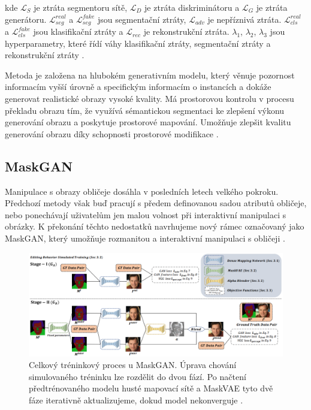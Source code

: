kde $\mathcal{L}_{S}$ je ztráta segmentoru sítě, $\mathcal{L}_D$ je ztráta diskriminátoru a  $\mathcal{L}_{G}$ je ztráta generátoru. $\mathcal{L}_{seg}^{real}$ a $\mathcal{L}_{seg}^{fake}$ jsou segmentační ztráty, $\mathcal{L}_{adv}$ je nepříznivá ztráta.  $\mathcal{L}_{cls}^{real}$ a $\mathcal{L}_{cls}^{fake}$ jsou klasifikační ztráty a $\mathcal{L}_{rec}$ je rekonstrukční ztráta. $\lambda _{1}$, $\lambda _{2}$, $\lambda _{3}$ jsou hyperparametry, které řídí váhy klasifikační ztráty, segmentační ztráty a rekonstrukční ztráty \cite{sggan}.

\bigskip

\noindent Metoda je založena na hlubokém generativním modelu, který věnuje pozornost informacím vyšší úrovně a specifickým informacím o instancích a dokáže generovat realistické obrazy vysoké kvality. Má prostorovou kontrolu v procesu překladu obrazu tím, že využívá sémantickou segmentaci ke zlepšení výkonu generování obrazu a poskytuje prostorové mapování. Umožňuje zlepšit kvalitu generování obrazu díky schopnosti prostorové modifikace \cite{reviewGANs}.

\newpage

\subsection*{MaskGAN}

Manipulace s obrazy obličeje dosáhla v posledních letech velkého pokroku. Předchozí metody však buď pracují s předem definovanou sadou atributů obličeje, nebo ponechávají uživatelům jen malou volnost při interaktivní manipulaci s obrázky. K překonání těchto nedostatků navrhujeme nový rámec označovaný jako MaskGAN, který umožňuje rozmanitou a interaktivní manipulaci s obličeji \cite{CelebAMask-HQ}.

\begin{figure}[hbt]
	\centering
	\includegraphics[width=1\textwidth]{obrazky-figures/struct-maskgan.png}
	\caption{Celkový tréninkový proces u MaskGAN. Úprava chování simulovaného tréninku lze rozdělit do dvou fází. Po načtení předtrénovaného modelu husté mapovací sítě a MaskVAE tyto dvě fáze iterativně aktualizujeme, dokud model nekonverguje \cite{CelebAMask-HQ}.}
        \label{fig:maskgan}
\end{figure}

